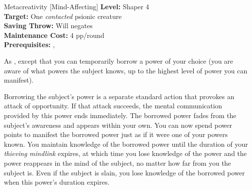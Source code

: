 {Metacreativity [Mind-Affecting]}
{
	\textbf{Level:}
	Shaper 4\\
	\textbf{Target:}
	One \emph{contacted} psionic creature\\
	\textbf{Saving Throw:}
	Will negates\\
	\textbf{Maintenance Cost:}
	4 pp/round\\
	\textbf{Prerequisites:}
	, \\
}
{
	As , except that you can temporarily borrow a power of your choice (you are aware of what powers the subject knows, up to the highest level of power you can manifest).

	Borrowing the subject's power is a separate standard action that provokes an attack of opportunity. If that attack succeeds, the mental communication provided by this power ends immediately. The borrowed power fades from the subject's awareness and appears within your own. You can now spend power points to manifest the borrowed power just as if it were one of your powers known. You maintain knowledge of the borrowed power until the duration of your \emph{thieving mindlink} expires, at which time you lose knowledge of the power and the power reappears in the mind of the subject, no matter how far from you the subject is. Even if the subject is slain, you lose knowledge of the borrowed power when this power's duration expires.
}